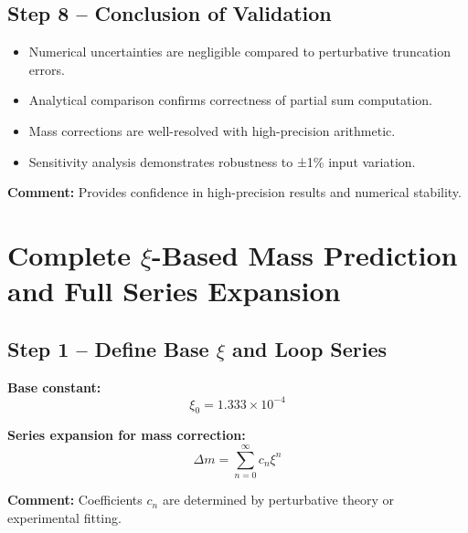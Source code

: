 \documentclass[12pt,a4paper]{article}
\begin{document}
\subsection{Step 8 – Conclusion of Validation}

\begin{itemize}
	\item Numerical uncertainties are negligible compared to perturbative truncation errors.
	\item Analytical comparison confirms correctness of partial sum computation.
	\item Mass corrections are well-resolved with high-precision arithmetic.
	\item Sensitivity analysis demonstrates robustness to ±1\% input variation.
\end{itemize}

\textbf{Comment:} Provides confidence in high-precision results and numerical stability.

\section{Complete $\xi$-Based Mass Prediction and Full Series Expansion}

\subsection{Step 1 – Define Base $\xi$ and Loop Series}

\textbf{Base constant:}
\begin{equation}
	\xi_0 = 1.333 \times 10^{-4}
\end{equation}

\textbf{Series expansion for mass correction:}
\begin{equation}
	\Delta m = \sum_{n=0}^{\infty} c_n \xi^n
\end{equation}

\textbf{Comment:} Coefficients $c_n$ are determined by perturbative theory or experimental fitting.

\end{document}
